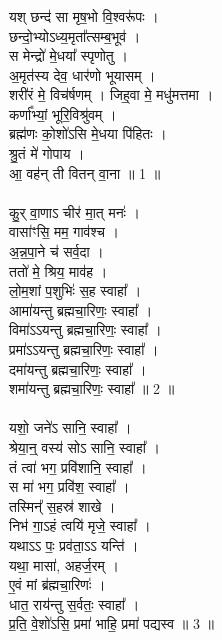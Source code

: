 \subsubsection{}
यश् छन्द॑ सा मृष॒भो वि॒श्वरू॑पः ।\\
छन्दो॒भ्योऽध्य॒मृता᳚त्सम्ब॒भूव॑ ।\\
स मेन्द्रो॑ मे॒धया᳚ स्पृणोतु ।\\
अ॒मृत॑स्य देव॒ धार॑णो भूयासम् ।\\
शरी॑रं मे॒ विच॑र्षणम् । जिह्॒वा मे॒ मधु॑मत्तमा ।\\
कर्णा᳚भ्यां॒ भूरि॒विश्रु॑वम् ।\\
ब्रह्म॑णः को॒शो॑ऽसि मे॒धया पि॑हितः ।\\
श्रु॒तं मे॑ गोपाय । \\
आ॒ वह॑न् ती वितन् वा॒ना ॥ 1 ॥\\
\\
कु॒र् वा॒णाऽ चीर॑ मा॒त् मनः॑ । \\
वासा॑ꣳसि॒ मम॒ गाव॑श्च ।\\
अ॒न्न॒पा॒ने च॑ सर्व॒दा ।\\
ततो॑ मे॒ श्रिय॒ माव॑ह ।\\
लो॒म॒शां प॒शुभिः॑ स॒ह स्वाहा᳚ ।\\
आमा॑यन्तु ब्रह्मचा॒रिणः॒ स्वाहा᳚ ।\\
विमा॑ऽऽयन्तु ब्रह्मचा॒रिणः॒ स्वाहा᳚ ।\\
प्रमा॑ऽऽयन्तु ब्रह्मचा॒रिणः॒ स्वाहा᳚ ।\\
दमा॑यन्तु ब्रह्मचा॒रिणः॒ स्वाहा᳚ ।\\
शमा॑यन्तु ब्रह्मचा॒रिणः॒ स्वाहा᳚ ॥ 2 ॥\\
\\
यशो॒ जने॑ऽ सानि॒ स्वाहा᳚ ।\\
श्रेया॒न्॒ वस्य॑ सोऽ सानि॒ स्वाहा᳚ ।\\
तं त्वा॑ भग॒ प्रवि॑शानि॒ स्वाहा᳚ ।\\
स मा॑ भग॒ प्रवि॑श॒ स्वाहा᳚ ।\\
तस्मिन्᳚ स॒हस्र॑ शाखे । \\
निभ॑ गा॒ऽहं त्वयि॑ मृजे॒ स्वाहा᳚ ।\\
यथाऽऽ पः॒ प्रव॑ता॒ऽऽ यन्ति॑ । \\
यथा॒ मासा॑, अहर्ज॒रम् ।\\
ए॒वं मां ब्र॑ह्मचा॒रिणः॑ । \\
धात॒ राय॑न्तु स॒र्वतः॒ स्वाहा᳚ ।\\
प्र॒ति॒ वे॒शो॑ऽसि॒ प्रमा॑ भाहि॒ प्रमा॑ पद्यस्व ॥ 3 ॥\\
